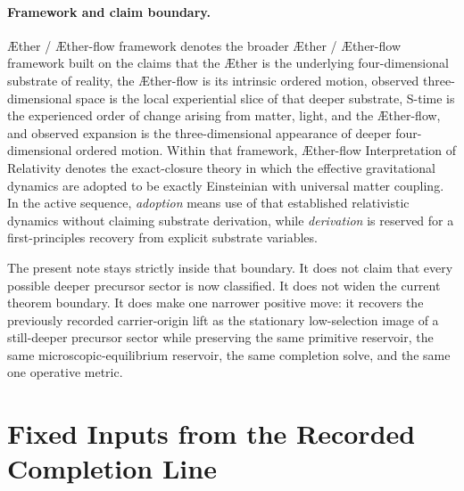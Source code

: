 \documentclass[11pt]{article}
\newcommand{\Aether}{\AE{}ther}
\newcommand{\Aflow}{\AE{}ther-flow}
\newcommand{\TheoryName}{\Aflow{} Interpretation of Relativity}
\newcommand{\TheoryProgram}{\Aether{} / \Aflow{} framework}
\begin{document}
\paragraph{Framework and claim boundary.}
\TheoryProgram{} denotes the broader \Aether{} / \Aflow{} framework built on the claims that the \Aether{} is the underlying four-dimensional substrate of reality, the \Aflow{} is its intrinsic ordered motion, observed three-dimensional space is the local experiential slice of that deeper substrate, S-time is the experienced order of change arising from matter, light, and the \Aflow{}, and observed expansion is the three-dimensional appearance of deeper four-dimensional ordered motion. Within that framework, \TheoryName{} denotes the exact-closure theory in which the effective gravitational dynamics are adopted to be exactly Einsteinian with universal matter coupling. In the active sequence, \emph{adoption} means use of that established relativistic dynamics without claiming substrate derivation, while \emph{derivation} is reserved for a first-principles recovery from explicit substrate variables.

The present note stays strictly inside that boundary. It does not claim that every possible deeper precursor sector is now classified. It does not widen the current theorem boundary. It does make one narrower positive move: it recovers the previously recorded carrier-origin lift as the stationary low-selection image of a still-deeper precursor sector while preserving the same primitive reservoir, the same microscopic-equilibrium reservoir, the same completion solve, and the same one operative metric.

\section{Fixed Inputs from the Recorded Completion Line}
\end{document}
